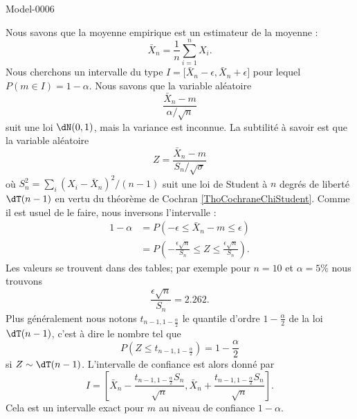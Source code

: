 
\begin{corrige}{Model-0006}

    Nous savons que la moyenne empirique est un estimateur de la moyenne :
    \begin{equation}
        \bar X_n=\frac{1}{ n }\sum_{i=1}^nX_i.
    \end{equation}
    Nous cherchons un intervalle du type \( I=\mathopen[ \bar X_n-\epsilon , \bar X_n+\epsilon \mathclose]\) pour lequel \( P(m\in I)=1-\alpha\). Nous savons que la variable aléatoire
    \begin{equation}
        \frac{ \bar X_n-m }{ \alpha/\sqrt{n} }
    \end{equation}
    suit une loi \( \dN(0,1)\), mais la variance est inconnue. La subtilité à savoir est que la variable aléatoire
    \begin{equation}
        Z=\frac{ \bar X_n-m }{ S_n/\sqrt{\sigma} }
    \end{equation}
    où \( S_n^2=\sum_i(X_i-\bar X_n)^2/(n-1)\) suit une loi de Student à \( n\) degrés de liberté \( \dT(n-1)\) en vertu du théorème de Cochran \ref{ThoCochraneChiStudent}. Comme il est usuel de le faire, nous inversons l'intervalle :
    \begin{subequations}
        \begin{align}
            1-\alpha&=P\left( -\epsilon\leq \bar X_n-m\leq \epsilon \right)\\
            &=P\left( -\frac{ \epsilon\sqrt{n} }{ S_n }\leq Z\leq \frac{ \epsilon\sqrt{n} }{ S_n } \right).
        \end{align}
    \end{subequations}
    Les valeurs se trouvent dans des tables; par exemple pour \( n=10\) et \( \alpha=5\%\) nous trouvons
    \begin{equation}
        \frac{ \epsilon\sqrt{n} }{ S_n }=2.262.
    \end{equation}
    Plus généralement nous notons \( t_{n-1,1-\frac{ \alpha }{2}}\) le quantile d'ordre \( 1-\frac{ \alpha }{2}\) de la loi \( \dT(n-1)\), c'est à dire le nombre tel que
    \begin{equation}
        P(Z\leq t_{n-1,1-\frac{ \alpha }{2}})=1-\frac{ \alpha }{2}
    \end{equation}
    si \( Z\sim\dT(n-1)\). L'intervalle de confiance est alors donné par
    \begin{equation}
        I=\left[ \bar X_n-\frac{ t_{n-1,1-\frac{ \alpha }{2}}S_n }{ \sqrt{n} },\bar X_n+\frac{ t_{n-1,1-\frac{ \alpha }{2}}S_n }{ \sqrt{n} } \right].
    \end{equation}
    Cela est un intervalle exact pour \( m\) au niveau de confiance \( 1-\alpha\).


\end{corrige}
